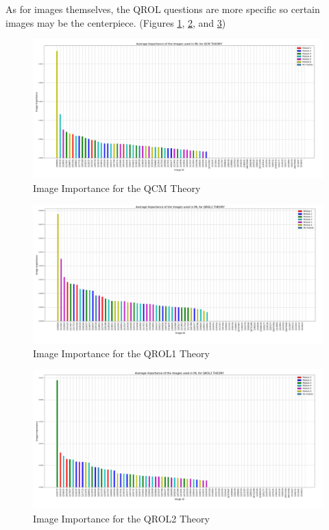 \documentclass[a4paper,11pt]{report}
\numberwithin{figure}{section} %
\begin{document}
    As for images themselves, the QROL questions are more specific so certain images may be the centerpiece. (Figures \ref{fig:im_th1}, \ref{fig:im_th2}, and \ref{fig:im_th3})

     \begin{figure}[H]
      \centering
      \includegraphics[width=.95\linewidth]{plots/im_importance_QCM_THEORY_2018-05-02_20_53_22.png}
      \caption{Image Importance for the QCM Theory}
      \label{fig:im_th1}
      \end{figure}

      \begin{figure}[H]
      \centering
      \includegraphics[width=.95\linewidth]{plots/im_importance_QROL1_THEORY_2018-05-02_20_54_25.png}
      \caption{Image Importance for the QROL1 Theory}
      \label{fig:im_th2}
      \end{figure}

      \begin{figure}[H]
      \centering
      \includegraphics[width=.95\linewidth]{plots/im_importance_QROL2_THEORY_2018-05-02_20_53_48.png}
      \caption{Image Importance for the QROL2 Theory}
      \label{fig:im_th3}
      \end{figure}
\end{document}

